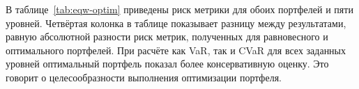 В таблице~\ref{tab:eqw-optim} приведены риск метрики для обоих портфелей и пяти уровней. 
Четвёртая колонка в таблице показывает разницу между результатами, равную абсолютной разности риск метрик, полученных для равновесного и оптимального портфелей. 
При расчёте как VaR, так и CVaR для всех заданных уровней оптимальный портфель показал более консервативную оценку.
Это говорит о целесообразности выполнения оптимизации портфеля.
